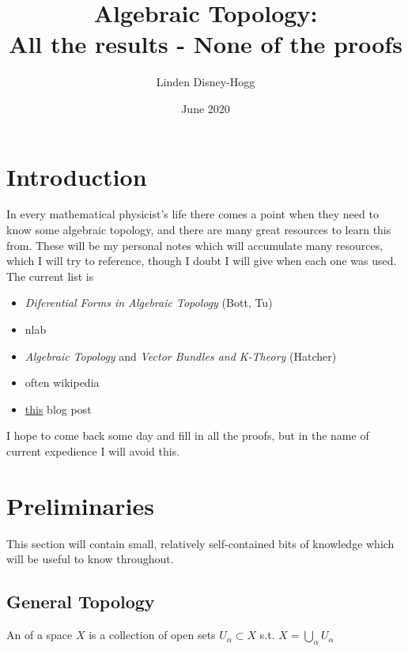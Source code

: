 \documentclass{article}
\title{Algebraic Topology: \\ All the results - None of the proofs }
\author{Linden Disney-Hogg}
\date{June 2020}
\begin{document}
\maketitle
\tableofcontents

\section{Introduction}
In every mathematical physicist's life there comes a point when they need to know some algebraic topology, and there are many great resources to learn this from. These will be my personal notes which will accumulate many resources, which I will try to reference, though I doubt I will give when each one was used. The current list is 
\begin{itemize}
	\item \textit{Diferential Forms in Algebraic Topology} (Bott, Tu)
	\item nlab
	\item \textit{Algebraic Topology} and \textit{Vector Bundles and K-Theory} (Hatcher) 
	\item often wikipedia
	\item  \href{https://amathew.wordpress.com/2011/08/05/chern-classes/?fbclid=IwAR28yPxJ8rlcn3DXnWs9ouq9fhrQH9VJ5giZ-JujFziTBD5dvM-pzMzMSig}{this} blog post
\end{itemize} 
I hope to come back some day and fill in all the proofs, but in the name of current expedience I will avoid this. 
\section{Preliminaries}
This section will contain small, relatively self-contained bits of knowledge which will be useful to know throughout. 
\subsection{General Topology}

\begin{definition}
	An  of a space $X$ is a collection of open sets $U_\alpha \subset X$ s.t. $X = \bigcup_\alpha U_\alpha$
\end{definition}
\end{document}
